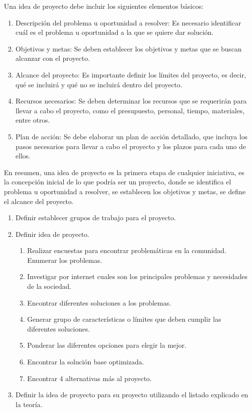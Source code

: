 \documentclass[../main]{subfiles}
\begin{document}
Una idea de proyecto debe incluir los siguientes elementos básicos:
\begin{enumerate}
  \item Descripción del problema u oportunidad a resolver: Es
    necesario identificar cuál es el problema u oportunidad a la que
    se quiere dar solución.
  \item Objetivos y metas: Se deben establecer los objetivos y metas
    que se buscan alcanzar con el proyecto.
  \item Alcance del proyecto: Es importante definir los límites del
    proyecto, es decir, qué se incluirá y qué no se incluirá dentro
    del proyecto.
  \item Recursos necesarios: Se deben determinar los recursos que se
    requerirán para llevar a cabo el proyecto, como el presupuesto,
    personal, tiempo, materiales, entre otros.
  \item Plan de acción: Se debe elaborar un plan de acción detallado,
    que incluya los pasos necesarios para llevar a cabo el proyecto y
    los plazos para cada uno de ellos.
\end{enumerate}
En resumen, una idea de proyecto es la primera etapa de cualquier
iniciativa, es la concepción inicial de lo que podría ser un
proyecto, donde se identifica el problema u oportunidad a resolver,
se establecen los objetivos y metas, se define el alcance del proyecto.
\begin{enumerate}
  \item Definir establecer grupos de trabajo para el proyecto.
  \item Definir idea de proyecto.
    \begin{enumerate}
      \item Realizar encuestas para encontrar problemáticas en la
        comunidad. Enumerar los problemas.
      \item Investigar por internet cuales son los principales
        problemas y necesidades de la sociedad.
      \item Encontrar diferentes soluciones a los problemas.
      \item Generar grupo de características o límites que deben
        cumplir las diferentes soluciones.
      \item Ponderar las diferentes opciones para elegir la mejor.
      \item Encontrar la solución base optimizada.
      \item Encontrar 4 alternativas más al proyecto.
    \end{enumerate}
  \item Definir la idea de proyecto para su proyecto utilizando el
    listado explicado en la teoría.
\end{enumerate}
\end{document}
